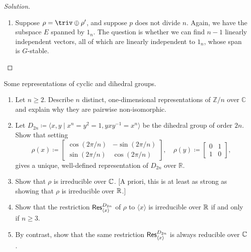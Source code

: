 \begin{proof}[Solution]
\begin{enumerate}[font=\normalfont,label=\textbf{(\alph*)}, wide]
\item Suppose $\rho = \triv \oplus \rho'$, and suppose $p$ does not divide $n$. Again, we have the subspace $E$ spanned by $1_n$. The question is whether we can find $n-1$ linearly independent vectors, all of which are linearly independent to $1_n$, whose span is $G$-stable.   

\end{enumerate}
\end{proof}

\newpage



\begin{problem}
Some representations of cyclic and dihedral groups.
\begin{enumerate}[font=\normalfont,label=\textbf{(\alph*)}]
\item Let $n \geq 2$. Describe $n$ distinct, one-dimensional representations of $\mathbb{Z}/n$ over $\mathbb{C}$ and explain why they are pairwise non-isomorphic. 

\item Let $D_{2n} \coloneqq \langle x, y \mid x^n = y^2 = 1, yxy^{-1} = x^n \rangle$ be the dihedral group of order $2n$. Show that setting 
\[
\rho(x) \coloneqq
\begin{bmatrix}
\cos(2\pi/n) & -\sin(2\pi/n) \\
\sin(2\pi/n) & \cos(2\pi/n)
\end{bmatrix}
, \quad
\rho(y) \coloneqq
\begin{bmatrix}
0 & 1 \\
1 & 0
\end{bmatrix}
,
\]
gives a unique, well-defined representation of $D_{2n}$ over $\mathbb{R}$. 

\item Show that $\rho$ is irreducible over $\mathbb{C}$. [A priori, this is at least as strong as showing that $\rho$ is irreducible over $\mathbb{R}$.]

\item Show that the restriction $\mathsf{Res}^{D_{2n}}_{\langle x\rangle}$ of $\rho$ to $\langle x \rangle$ is irreducible over $\mathbb{R}$ if and only if $n\geq 3$. 

\item By contrast, show that the same restriction $\mathsf{Res}^{D_{2n}}_{\langle x\rangle}$ is always reducible over $\mathbb{C}$.
\end{enumerate}
\end{problem}

